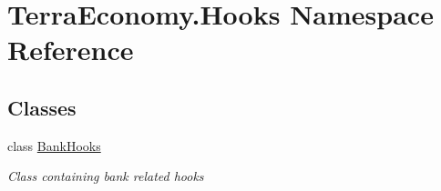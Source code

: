 \hypertarget{namespace_terra_economy_1_1_hooks}{}\section{Terra\+Economy.\+Hooks Namespace Reference}
\label{namespace_terra_economy_1_1_hooks}
\subsection*{Classes}
\begin{DoxyCompactItemize}
\item 
class \hyperlink{class_terra_economy_1_1_hooks_1_1_bank_hooks}{Bank\+Hooks}
\begin{DoxyCompactList}\small\item\em Class containing bank related hooks \end{DoxyCompactList}\end{DoxyCompactItemize}
